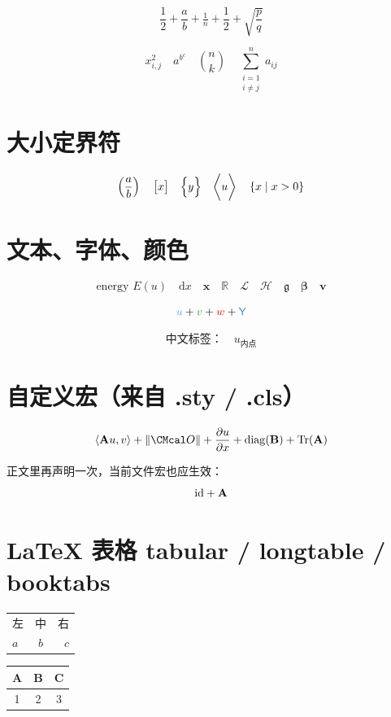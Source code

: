 \documentclass{silkmath-fixture}
\begin{document}
\[
  \frac{1}{2}+\dfrac{a}{b}+\tfrac{1}{n}+\frac12+\sqrt{\frac{p}{q}}
\]

\[
  x^{2}_{i,j} \quad a^{b^{c}} \quad \binom{n}{k}
  \quad \sum_{\substack{i=1\\ i\neq j}}^{n} a_{ij}
\]

\section{大小定界符}

\[
  \left( \frac{a}{b} \right)
  \quad \bigl[ x \bigr]
  \quad \Bigl\{ y \Bigr\}
  \quad \biggl\langle u \biggr\rangle
  \quad \left\{ x \;\middle|\; x>0 \right\}
\]

\section{文本、字体、颜色}

\[
  \text{energy } E(u)
  \quad \mathrm{d}x
  \quad \mathbf{x}
  \quad \mathbb{R}
  \quad \mathcal{L}
  \quad \mathscr{H}
  \quad \mathfrak{g}
  \quad \boldsymbol{\beta}
  \quad \bm{v}
\]

\[
  \textcolor{Accent}{u}
  +\textcolor{Ok}{v}
  +\textcolor{Warn}{w}
  +\textcolor{ClsAccent}{\clsOnly{Y}}
\]

\[
  \text{中文标签：} \quad u_{\text{内点}}
\]

\section{自定义宏（来自 .sty / .cls）}

\[
  \ip{\A u}{v} + \norm{\Ocal} + \pd{u}{x} + \diag(\B) + \Tr(\A)
\]

正文里再声明一次，当前文件宏也应生效：
\newcommand{\fileMacro}[1]{\mathrm{#1}}
\[
  \fileMacro{id} + \A
\]

\section{LaTeX 表格 tabular / longtable / booktabs}

\begin{tabular}{l|cr}
  左 & 中 & 右 \\
  $a$ & $b$ & $c$
\end{tabular}

\begin{tabular}{|c|c|c|}
  \hline
  A & B & C \\
  \hline
  1 & 2 & 3 \\
  \hline
\end{tabular}
\end{document}
